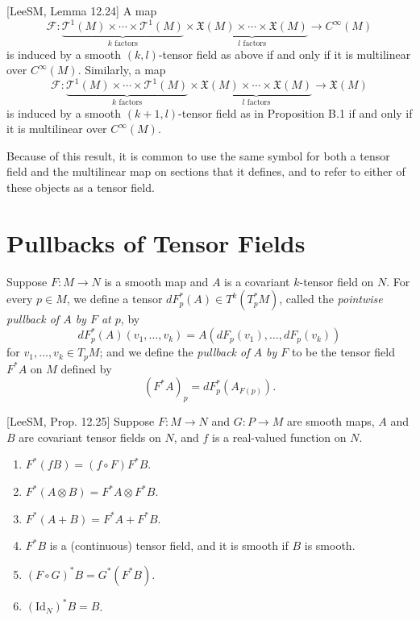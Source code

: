 \begin{lemma}
\label{lem:tensor-characterization-lemma}

[LeeSM, Lemma 12.24] A map
\[
\mathcal{F}: \underbrace{\mathcal{T}^1(M) \times \cdots \times \mathcal{T}^1(M)}_{k \text{ factors}} \times \underbrace{\mathfrak{X}(M) \times \cdots \times \mathfrak{X}(M)}_{l \text{ factors}} \to C^\infty(M)
\]
is induced by a smooth $(k,l)$-tensor field as above if and only if it is multilinear over $C^\infty(M)$. Similarly, a map
\[
\mathcal{F}: \underbrace{\mathcal{T}^1(M) \times \cdots \times \mathcal{T}^1(M)}_{k \text{ factors}} \times \underbrace{\mathfrak{X}(M) \times \cdots \times \mathfrak{X}(M)}_{l \text{ factors}} \to \mathfrak{X}(M)
\]
is induced by a smooth $(k+1,l)$-tensor field as in Proposition B.1 if and only if it is multilinear over $C^\infty(M)$.
\end{lemma}

Because of this result, it is common to use the same symbol for both a tensor field and the multilinear map on sections that it defines, and to refer to either of these objects as a tensor field.

\section{Pullbacks of Tensor Fields}

Suppose $F: M \to N$ is a smooth map and $A$ is a covariant $k$-tensor field on $N$. For every $p \in M$, we define a tensor $dF_p^*(A) \in T^k(T_p^* M)$, called the \emph{pointwise pullback of $A$ by $F$ at $p$}, by
\[
dF_p^*(A)(v_1, \ldots, v_k) = A(dF_p(v_1), \ldots, dF_p(v_k))
\]
for $v_1, \ldots, v_k \in T_p M$; and we define the \emph{pullback of $A$ by $F$} to be the tensor field $F^* A$ on $M$ defined by
\[
(F^* A)_p = dF_p^*(A_{F(p)}).
\]

\begin{proposition}
\label{prop:tensor-pullback-properties}

[LeeSM, Prop. 12.25] Suppose $F: M \to N$ and $G: P \to M$ are smooth maps, $A$ and $B$ are covariant tensor fields on $N$, and $f$ is a real-valued function on $N$.
\begin{enumerate}
\item[(a)] $F^*(fB) = (f \circ F) F^* B$.
\item[(b)] $F^*(A \otimes B) = F^* A \otimes F^* B$.
\item[(c)] $F^*(A + B) = F^* A + F^* B$.
\item[(d)] $F^* B$ is a (continuous) tensor field, and it is smooth if $B$ is smooth.
\item[(e)] $(F \circ G)^* B = G^*(F^* B)$.
\item[(f)] $(\text{Id}_N)^* B = B$.
\end{enumerate}
\end{proposition}

